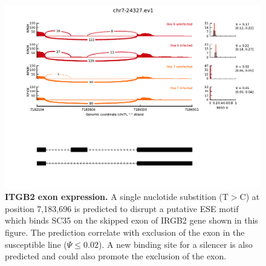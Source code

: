 \documentclass[10pt]{article}
\begin{document}
\begin{figure}[!ht]
    \begin{center}
        \includegraphics[width=6in]{itgb2_miso.pdf}
    \end{center}
    \caption{
        {\bf ITGB2 exon expression.}
        A single nuclotide substition (T$>$C) at position
        7,183,696 is predicted to disrupt a putative ESE motif
        which binds SC35 on the skipped exon of IRGB2 gene shown
        in this figure.  The prediction correlate with exclusion
        of the exon in the susceptible line ($\Psi \leq 0.02$).
    A new binding site for a silencer is also predicted and could
also promote the exclusion of the exon.  }
    \label{itgb2}
\end{figure}
\end{document}
